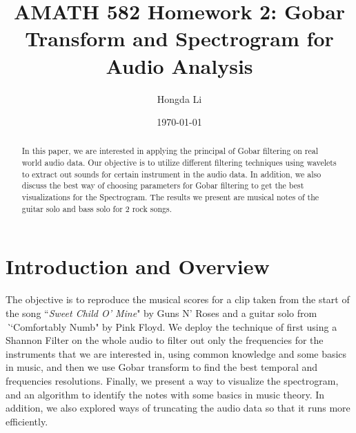 \documentclass{article}
\title{AMATH 582 Homework 2: Gobar Transform and Spectrogram for Audio Analysis}
\author{Hongda Li}
\date{\today}
\begin{document}
\maketitle

\begin{abstract}
   In this paper, we are interested in applying the principal of Gobar filtering on real world audio data. Our objective is to utilize different filtering techniques using wavelets to extract out sounds for certain instrument in the audio data. In addition, we also discuss the best way of choosing parameters for Gobar filtering to get the best visualizations for the Spectrogram. The results we present are musical notes of the guitar solo and bass solo for 2 rock songs. 
\end{abstract}


\section{Introduction and Overview}
    
    \par\hspace{1.1em}
    The objective is to reproduce the musical scores for a clip taken from the start of the song ``\textit{Sweet Child O' Mine}"  by Guns N' Roses and a guitar solo from \textit``{Comfortably Numb}" by Pink Floyd. We deploy the technique of first using a Shannon Filter on the whole audio to filter out only the frequencies for the instruments that we are interested in, using common knowledge and some basics in music, and then we use Gobar transform to find the best temporal and frequencies resolutions. Finally, we present a way to visualize the spectrogram, and an algorithm to identify the notes with some basics in music theory. In addition, we also explored ways of truncating the audio data so that it runs more efficiently.
\end{document}
